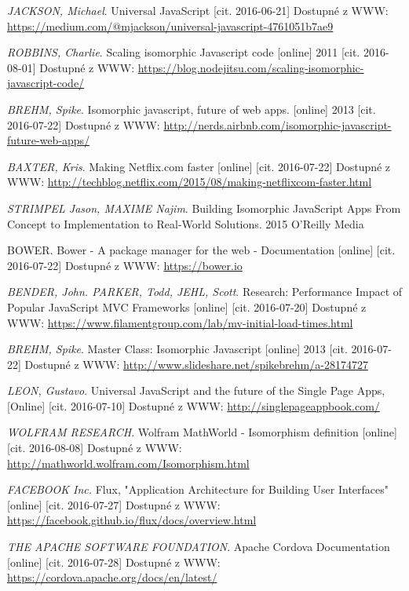 \begin{thebibliography}{10}
\textit{JACKSON, Michael}. Universal JavaScript [cit. 2016-06-21] Dostupné z WWW: \url{https://medium.com/@mjackson/universal-javascript-4761051b7ae9}

 \textit{ROBBINS, Charlie}. Scaling isomorphic Javascript code [online] 2011 [cit. 2016-08-01] Dostupné z WWW: \url{https://blog.nodejitsu.com/scaling-isomorphic-javascript-code/}

 \textit{BREHM, Spike}. Isomorphic javascript, future of web apps. [online] 2013 [cit. 2016-07-22] Dostupné z WWW: \url{http://nerds.airbnb.com/isomorphic-javascript-future-web-apps/}

 \textit{BAXTER, Kris}. Making Netflix.com faster [online] [cit. 2016-07-22] Dostupné z WWW: \url{http://techblog.netflix.com/2015/08/making-netflixcom-faster.html}

 \textit{STRIMPEL Jason, MAXIME Najim}. Building Isomorphic JavaScript Apps From Concept to Implementation to Real-World Solutions. 2015 O'Reilly Media

 {BOWER}. Bower - A package manager for the web - Documentation [online] [cit. 2016-07-22] Dostupné z WWW: \url{https://bower.io}

 \textit{BENDER, John. PARKER, Todd, JEHL, Scott}. Research: Performance Impact of Popular JavaScript MVC Frameworks [online] [cit. 2016-07-20] Dostupné z WWW: \url{https://www.filamentgroup.com/lab/mv-initial-load-times.html}

 \textit{BREHM, Spike}. Master Class: Isomorphic Javascript [online] 2013 [cit. 2016-07-22] Dostupné z WWW: \url{http://www.slideshare.net/spikebrehm/a-28174727}

 \textit{LEON, Gustavo}. Universal JavaScript and the future of the Single Page Apps, [Online] [cit. 2016-07-10] Dostupné z WWW: \url{http://singlepageappbook.com/}

 \textit{WOLFRAM RESEARCH}. Wolfram MathWorld - Isomorphism definition [online] [cit. 2016-08-08] Dostupné z WWW: \url{http://mathworld.wolfram.com/Isomorphism.html}

 \textit{FACEBOOK Inc.} Flux, "Application Architecture for Building User Interfaces" [online] [cit. 2016-07-27] Dostupné z WWW: \url{https://facebook.github.io/flux/docs/overview.html}

 \textit{THE APACHE SOFTWARE FOUNDATION}. Apache Cordova Documentation [online] [cit. 2016-07-28] Dostupné z WWW: \url{https://cordova.apache.org/docs/en/latest/}


\end{thebibliography}
